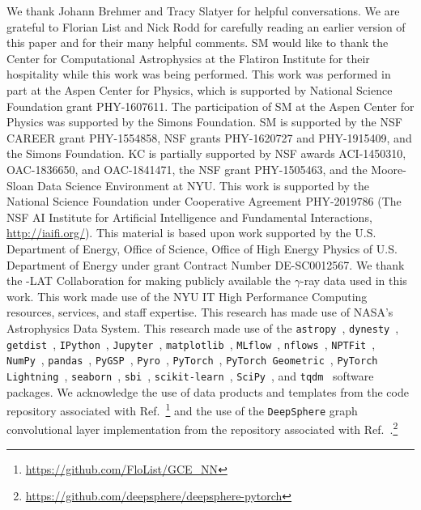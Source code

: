 \documentclass[prd,aps,10pt,nofootinbib,twocolumn,superscriptaddress,preprintnumbers,balancelastpage,longbibliography]{revtex4-1}
\begin{document}
\begin{acknowledgments}

We thank Johann Brehmer and Tracy Slatyer for helpful conversations. We are grateful to Florian List and Nick Rodd for carefully reading an earlier version of this paper and for their many helpful comments.
SM would like to thank the Center for Computational Astrophysics at the Flatiron Institute for their hospitality while this work was being performed. 
This work was performed in part at the Aspen Center for Physics, which is supported by National Science Foundation grant PHY-1607611.
The participation of SM at the Aspen Center for Physics was supported by the Simons Foundation.
SM is supported by the NSF CAREER grant PHY-1554858, NSF grants PHY-1620727 and PHY-1915409, and the Simons Foundation. 
KC is partially supported by NSF awards ACI-1450310, OAC-1836650, and OAC-1841471, the NSF grant PHY-1505463, and the Moore-Sloan Data Science Environment at NYU. 
This work is supported by the National Science Foundation under Cooperative Agreement PHY-2019786 (The NSF AI Institute for Artificial Intelligence and Fundamental Interactions, \url{http://iaifi.org/}).
This material is based upon work supported by the U.S. Department of Energy, Office of Science, Office of High Energy Physics of U.S. Department of Energy under grant Contract Number DE-SC0012567.
We thank the \Fermi-LAT Collaboration for making publicly available the $\gamma$-ray data used in this work.
This work made use of the NYU IT High Performance Computing resources, services, and staff expertise. 
This research has made use of NASA's Astrophysics Data System. 
This research made use of the \texttt{astropy}~\cite{Price-Whelan:2018hus,Robitaille:2013mpa}, \texttt{dynesty}~\cite{Speagle_2020}, \texttt{getdist}~\cite{Lewis:2019xzd}, \texttt{IPython}~\cite{PER-GRA:2007}, \texttt{Jupyter}~\cite{Kluyver2016JupyterN}, \texttt{matplotlib}~\cite{Hunter:2007}, \texttt{MLflow}~\cite{chen2020developments}, \texttt{nflows}~\cite{nflows}, \texttt{NPTFit}~\cite{Mishra-Sharma:2016gis}, \texttt{NumPy}~\cite{harris2020array}, \texttt{pandas}~\cite{pandas:2010}, \texttt{PyGSP}~\cite{michael_defferrard_2017_1003158}, \texttt{Pyro}~\cite{bingham2018pyro}, \texttt{PyTorch}~\cite{NEURIPS2019_9015}, \texttt{PyTorch Geometric}~\cite{Fey/Lenssen/2019}, \texttt{PyTorch Lightning}~\cite{william_falcon_2020_3828935}, \texttt{seaborn}~\cite{seaborn}, \texttt{sbi}~\cite{tejero-cantero2020sbi}, \texttt{scikit-learn}~\cite{scikit-learn}, \texttt{SciPy}~\cite{2020SciPy-NMeth}, and \texttt{tqdm}~\cite{da2019tqdm} software packages. We acknowledge the use of data products and templates from the code repository associated with Ref.~\cite{List:2020mzd}\footnote{\url{https://github.com/FloList/GCE_NN}} and the use of the \texttt{DeepSphere} graph convolutional layer implementation from the repository associated with Ref.~\cite{defferrard2020deepsphere}.\footnote{\url{https://github.com/deepsphere/deepsphere-pytorch}}
\end{acknowledgments}
\end{document}
